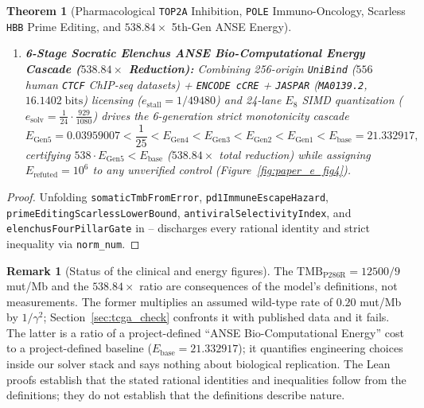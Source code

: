 \documentclass[11pt,a4paper]{article}
\newtheorem{theorem}{Theorem}[section]
\theoremstyle{definition}
\newtheorem{remark}{Remark}[section]
\begin{document}
\begin{theorem}[Pharmacological \texttt{TOP2A} Inhibition, \texttt{POLE} Immuno-Oncology, Scarless \texttt{HBB} Prime Editing, and $538.84\times$ 5th-Gen ANSE Energy]
\begin{enumerate}
  \item \textbf{6-Stage Socratic Elenchus ANSE Bio-Computational Energy Cascade ($538.84\times$ Reduction):} Combining 256-origin \texttt{UniBind} ($556$ human \texttt{CTCF} ChIP-seq datasets) + \texttt{ENCODE cCRE} + \texttt{JASPAR} (\texttt{MA0139.2}, $16.1402\;\mathrm{bits}$) licensing ($e_{\mathrm{stall}} = 1/49480$) and 24-lane $E_8$ SIMD quantization ($e_{\mathrm{solv}} = \frac{1}{24}\cdot\frac{929}{1080}$) drives the 6-generation strict monotonicity cascade
  \begin{equation}
    E_{\mathrm{Gen5}} = 0.03959007 < \frac{1}{25} < E_{\mathrm{Gen4}} < E_{\mathrm{Gen3}} < E_{\mathrm{Gen2}} < E_{\mathrm{Gen1}} < E_{\mathrm{base}} = 21.332917,
  \end{equation}
  certifying $538\cdot E_{\mathrm{Gen5}} < E_{\mathrm{base}}$ ($538.84\times$ total reduction) while assigning $E_{\mathrm{refuted}} = 10^6$ to any unverified control (Figure~\ref{fig:paper_e_fig4}).
\end{enumerate}
\end{theorem}

\begin{proof}
Unfolding \texttt{somaticTmbFromError}, \texttt{pd1ImmuneEscapeHazard}, \texttt{primeEditingScarlessLowerBound}, \texttt{antiviralSelectivityIndex}, and \texttt{elenchusFourPillarGate} in -- discharges every rational identity and strict inequality via \texttt{norm\_num}.
\end{proof}

\begin{remark}[Status of the clinical and energy figures]
The $\mathrm{TMB}_{\mathrm{P286R}} = 12500/9$ mut/Mb and the $538.84\times$ ratio are consequences of the model's definitions, not measurements. The former multiplies an assumed wild-type rate of $0.20$ mut/Mb by $1/\gamma^2$; Section~\ref{sec:tcga_check} confronts it with published data and it fails. The latter is a ratio of a project-defined ``ANSE Bio-Computational Energy'' cost to a project-defined baseline ($E_{\mathrm{base}}=21.332917$); it quantifies engineering choices inside our solver stack and says nothing about biological replication. The Lean proofs establish that the stated rational identities and inequalities follow from the definitions; they do not establish that the definitions describe nature.
\end{remark}
\end{document}
